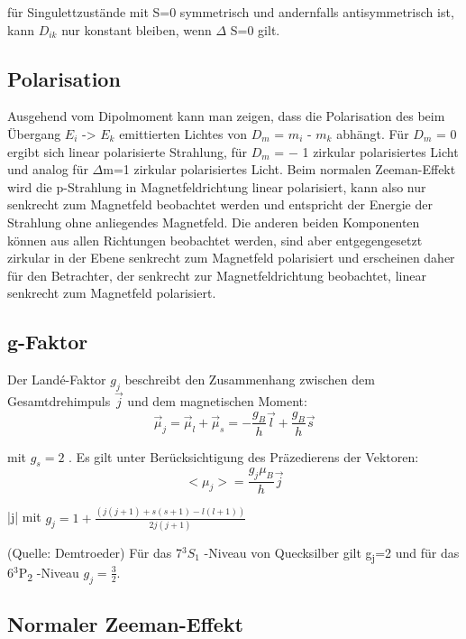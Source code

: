 \documentclass[10pt,a4paper]{article}
\begin{document}
für Singulettzustände mit S=0 symmetrisch und andernfalls antisymmetrisch ist, kann $D_{ik}$ nur konstant bleiben, wenn $\Delta$ S=0 gilt.


\subsection{Polarisation}


Ausgehend vom Dipolmoment kann man zeigen, dass die Polarisation des beim Übergang $E_i$ -> $E_k$  emittierten Lichtes von $D_m$ = $m_{i}$ - $m_{k}$  abhängt. Für $D_{m}$ =  0 ergibt sich linear polarisierte Strahlung, für $D_m$ = − 1 zirkular polarisiertes Licht und analog für $\Delta$m=1 zirkular polarisiertes Licht. Beim normalen Zeeman-Effekt wird die p-Strahlung in Magnetfeldrichtung linear polarisiert, kann also nur senkrecht zum Magnetfeld beobachtet werden und entspricht der Energie der Strahlung ohne anliegendes Magnetfeld. Die anderen beiden Komponenten können aus allen Richtungen beobachtet werden, sind aber entgegengesetzt zirkular in der Ebene senkrecht zum Magnetfeld polarisiert und erscheinen daher für den Betrachter, der senkrecht zur Magnetfeldrichtung beobachtet, linear senkrecht zum Magnetfeld polarisiert.

\subsection{ g-Faktor}

Der Landé-Faktor $g_j$ beschreibt den Zusammenhang zwischen dem Gesamtdrehimpuls $\overrightarrow{j}$ und dem magnetischen Moment:
\begin{equation}
	\overrightarrow{\mu}_{j}= \overrightarrow{\mu}_{l}+\overrightarrow{\mu}_{s}=−
	\frac {g_{B}}{h}
	\overrightarrow{l} + \frac {g_{B}}{h}
	\overrightarrow{s}
\end{equation}

mit $g_{s} = 2$ .  Es gilt unter Berücksichtigung des Präzedierens der Vektoren:
\begin{equation}
	<\mu_{j}>= \frac {g_{j}\mu_{B}}{h}\overrightarrow{j}
\end{equation}

|j| mit $g_{j}=1+\frac{(j(j+1)+s(s+1)−l(l+1))}{2j(j+1)}$

(Quelle: Demtroeder)
Für das 7$^3S_{1}$ -Niveau von Quecksilber gilt g\textsubscript{j}=2 und für das 6$^3$P\textsubscript{2} -Niveau $g_{j}=\frac{3}{2} $.

\subsection{Normaler Zeeman-Effekt}
\end{document}
